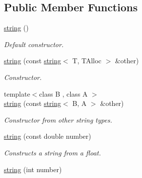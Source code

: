 \subsection*{Public Member Functions}
\begin{DoxyCompactItemize}
\item 
\hyperlink{classirr_1_1core_1_1string_a7b207d82c9fa6be0b7fc84b8cfed9561}{string} ()\hypertarget{classirr_1_1core_1_1string_a7b207d82c9fa6be0b7fc84b8cfed9561}{}\label{classirr_1_1core_1_1string_a7b207d82c9fa6be0b7fc84b8cfed9561}

\begin{DoxyCompactList}\small\item\em Default constructor. \end{DoxyCompactList}\item 
\hyperlink{classirr_1_1core_1_1string_ace91a16cab7d366746f6dfe3fa5e8b57}{string} (const \hyperlink{classirr_1_1core_1_1string}{string}$<$ T, T\+Alloc $>$ \&other)\hypertarget{classirr_1_1core_1_1string_ace91a16cab7d366746f6dfe3fa5e8b57}{}\label{classirr_1_1core_1_1string_ace91a16cab7d366746f6dfe3fa5e8b57}

\begin{DoxyCompactList}\small\item\em Constructor. \end{DoxyCompactList}\item 
{\footnotesize template$<$class B , class A $>$ }\\\hyperlink{classirr_1_1core_1_1string_a9928529c22e85f130aef250db6122f95}{string} (const \hyperlink{classirr_1_1core_1_1string}{string}$<$ B, A $>$ \&other)\hypertarget{classirr_1_1core_1_1string_a9928529c22e85f130aef250db6122f95}{}\label{classirr_1_1core_1_1string_a9928529c22e85f130aef250db6122f95}

\begin{DoxyCompactList}\small\item\em Constructor from other string types. \end{DoxyCompactList}\item 
\hyperlink{classirr_1_1core_1_1string_acca907e6c20f3d3494e17e5b3098773e}{string} (const double number)\hypertarget{classirr_1_1core_1_1string_acca907e6c20f3d3494e17e5b3098773e}{}\label{classirr_1_1core_1_1string_acca907e6c20f3d3494e17e5b3098773e}

\begin{DoxyCompactList}\small\item\em Constructs a string from a float. \end{DoxyCompactList}\item 
\hyperlink{classirr_1_1core_1_1string_a39a2ee63ce82d6c87b931a7f9a66793c}{string} (int number)\hypertarget{classirr_1_1core_1_1string_a39a2ee63ce82d6c87b931a7f9a66793c}{}\label{classirr_1_1core_1_1string_a39a2ee63ce82d6c87b931a7f9a66793c}


\end{DoxyCompactItemize}

